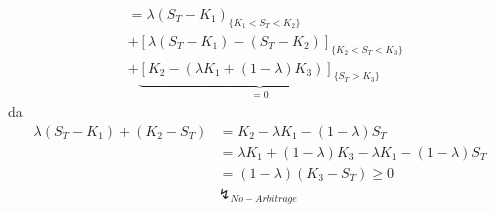 \documentclass[a4paper, pagesize=pdftex, pdftex, twoside, headsepline, index=totoc,toc=listof, fontsize=10pt, cleardoublepage=empty, headinclude, DIV=13, BCOR=13mm]{scrartcl}
\begin{document}
\begin{enumerate}[(i)]
\begin{equation*}
\begin{aligned}
		&= \lambda(S_T-K_1)_{\{K_1<S_T<K_2\}} \\
		&+ \left[\lambda(S_T-K_1)-(S_T-K_2)\right]_{\{K_2<S_T<K_3\}} \\
		&+ \underbrace{\left[K_2 -(\lambda K_1+(1-\lambda)K_3)\right]_{\{S_T>K_3\}}}_{=0}
	\end{aligned}
	\end{equation*}
	da 
	\begin{equation*}
	\begin{aligned}
		\lambda (S_T-K_1)+(K_2-S_T) &= K_2-\lambda K_1-(1-\lambda)S_T \\
		&= \lambda K_1 + (1-\lambda)K_3-\lambda K_1-(1-\lambda)S_T \\
		&= (1-\lambda)(K_3-S_T) \ge 0 \\
		&\lightning_{No-Arbitrage}
	\end{aligned}
	\end{equation*}
	
\end{enumerate}
\end{document}
